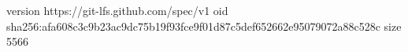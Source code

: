 version https://git-lfs.github.com/spec/v1
oid sha256:afa608c3c9b23ac9dc75b19f93fce9f01d87c5def652662e95079072a88c528c
size 5566
